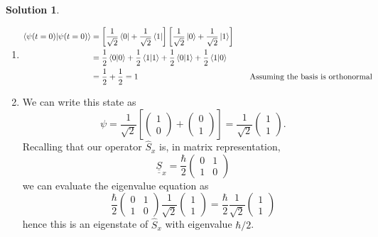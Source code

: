 \documentclass[10pt]{article}
\theoremstyle{definition}
\newtheorem{soln}{Solution}
\newcommand{\justif}[2]{&{#1}&\text{#2}}
\newcommand{\dul}[1]{\underline{\underline{#1}}}
\begin{document}
\begin{soln}
  \begin{enumerate}[label=(\alph*)]
    \item \begin{align*}
            \bra{\psi(t=0)}\ket{\psi(t=0)} & =\left[\frac{1}{\sqrt{2}}\bra{0}+\frac{1}{\sqrt{2}}\bra{1}\right]\left[\frac{1}{\sqrt{2}}\ket{0}+\frac{1}{\sqrt{2}}\ket{1}\right] \\
                                           & =\frac{1}{2}\bra{0}\ket{0}+\frac{1}{2}\bra{1}\ket{1}+\frac{1}{2}\bra{0}\ket{1}+\frac{1}{2}\bra{1}\ket{0}                          \\
                                           & =\frac{1}{2}+\frac{1}{2}=1 \justif{\quad}{Assuming the basis is orthonormal}
          \end{align*}
    \item We can write this state as $$\psi=\frac{1}{\sqrt{2}}\left[\begin{pmatrix}
                1 \\0
              \end{pmatrix}+\begin{pmatrix}
                0 \\1
              \end{pmatrix}\right]=\frac{1}{\sqrt{2}}\begin{pmatrix}
              1 \\1
            \end{pmatrix}.$$
          Recalling that our operator $\hat{S}_x$ is, in matrix representation, $$\dul{S}_x=\frac{\hbar}{2}\begin{pmatrix}
              0 & 1 \\
              1 & 0
            \end{pmatrix}$$
            we can evaluate the eigenvalue equation as
            $$\frac{\hbar}{2}\begin{pmatrix}
              0 & 1 \\
              1 & 0
            \end{pmatrix}\frac{1}{\sqrt{2}}\begin{pmatrix}
              1 \\1
            \end{pmatrix}=\frac{\hbar}{2}\frac{1}{\sqrt{2}}\begin{pmatrix}
              1 \\1
            \end{pmatrix}$$
            hence this is an eigenstate of $\hat{S}_x$ with eigenvalue $\hbar/2$.

\end{enumerate}
\end{soln}
\end{document}
